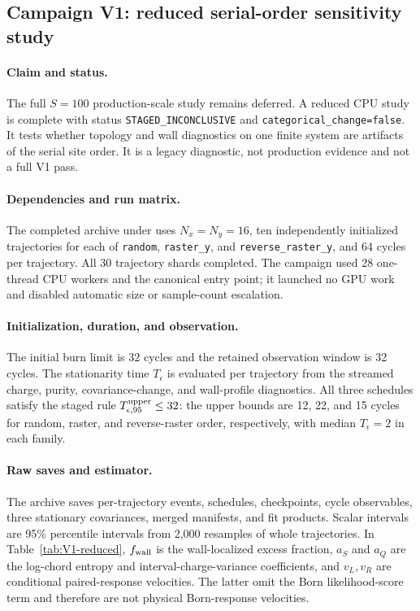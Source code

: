 \documentclass[aps,prx,twocolumn,floatfix,nofootinbib,superscriptaddress,longbibliography]{revtex4-2}
\newcommand{\code}[1]{\texttt{#1}}
\begin{document}
\subsection{Campaign V1: reduced serial-order sensitivity study}
\label{camp:V1}
\paragraph*{Claim and status.}
The full $S=100$ production-scale study remains deferred.  A reduced CPU study is complete
with status \code{STAGED\_INCONCLUSIVE} and \code{categorical\_change=false}.  It tests
whether topology and wall diagnostics on one finite system are artifacts of the serial
site order.  It is a legacy diagnostic, not production evidence and not a full V1 pass.

\paragraph*{Dependencies and run matrix.}
The completed archive under
uses $N_x=N_y=16$, ten independently initialized trajectories for each of
\code{random}, \code{raster\_y}, and \code{reverse\_raster\_y}, and 64 cycles per
trajectory.  All 30 trajectory shards completed.  The campaign used 28 one-thread CPU
workers and the canonical  entry point; it launched
no GPU work and disabled automatic size or sample-count escalation.

\paragraph*{Initialization, duration, and observation.}
The initial burn limit is 32 cycles and the retained observation window is 32 cycles.
The stationarity time $T_\epsilon$ is evaluated per trajectory from the streamed charge,
purity, covariance-change, and wall-profile diagnostics.  All three schedules satisfy the
staged rule $T_{\epsilon,95}^{\rm upper}\le32$: the upper bounds are 12, 22, and 15 cycles
for random, raster, and reverse-raster order, respectively, with median $T_\epsilon=2$ in
each family.

\paragraph*{Raw saves and estimator.}
The archive saves per-trajectory events, schedules, checkpoints, cycle observables, three
stationary covariances, merged manifests, and fit products.  Scalar intervals are 95\%
percentile intervals from 2,000 resamples of whole trajectories.  In
Table~\ref{tab:V1-reduced}, $f_{\rm wall}$ is the wall-localized excess fraction,
$a_S$ and $a_Q$ are the log-chord entropy and interval-charge-variance coefficients, and
$v_L,v_R$ are conditional paired-response velocities.  The latter omit the Born
likelihood-score term and therefore are not physical Born-response velocities.
\end{document}
